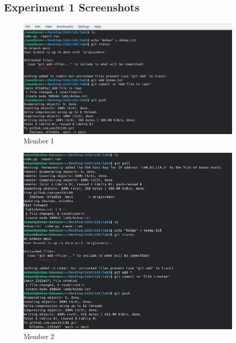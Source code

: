 \documentclass[titlepage, 12pt]{article}
\begin{document}
\newpage{}

\begin{appendices}
  \section{Experiment 1 Screenshots}

  \begin{figure}[H]
    \includegraphics[width=\textwidth]{e1m1}
    \caption{Member 1}
  \end{figure}
  \begin{figure}[H]
    \includegraphics[width=\textwidth]{e1m2}
    \caption{Member 2}
  \end{figure}
  \begin{figure}[H]

\end{figure}
\end{appendices}
\end{document}
